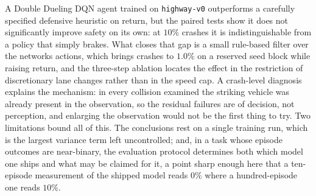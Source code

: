 \documentclass{article}
\begin{document}
A Double Dueling DQN agent trained on \texttt{highway-v0} outperforms a carefully specified defensive heuristic on return, but the paired tests show it does not significantly improve safety on its own: at $10\%$ crashes it is indistinguishable from a policy that simply brakes. What closes that gap is a small rule-based filter over the networks actions, which brings crashes to $1.0\%$ on a reserved seed block while raising return, and the three-step ablation locates the effect in the restriction of discretionary lane changes rather than in the speed cap. A crash-level diagnosis explains the mechanism: in every collision examined the striking vehicle was already present in the observation, so the residual failures are of decision, not perception, and enlarging the observation would not be the first thing to try. Two limitations bound all of this. The conclusions rest on a single training run, which is the largest variance term left uncontrolled; and, in a task whose episode outcomes are near-binary, the evaluation protocol determines both which model one ships and what may be claimed for it, a point sharp enough here that a ten-episode measurement of the shipped model reads $0\%$ where a hundred-episode one reads $10\%$.



\end{document}
